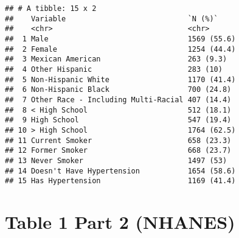 \documentclass[
]{article}
\newenvironment{Shaded}{\begin{snugshade}}{\end{snugshade}}
\newcommand{\AttributeTok}[1]{\textcolor[rgb]{0.13,0.29,0.53}{#1}}
\newcommand{\CommentTok}[1]{\textcolor[rgb]{0.56,0.35,0.01}{\textit{#1}}}
\newcommand{\DecValTok}[1]{\textcolor[rgb]{0.00,0.00,0.81}{#1}}
\newcommand{\DocumentationTok}[1]{\textcolor[rgb]{0.56,0.35,0.01}{\textbf{\textit{#1}}}}
\newcommand{\FunctionTok}[1]{\textcolor[rgb]{0.13,0.29,0.53}{\textbf{#1}}}
\newcommand{\NormalTok}[1]{#1}
\newcommand{\OtherTok}[1]{\textcolor[rgb]{0.56,0.35,0.01}{#1}}
\newcommand{\SpecialCharTok}[1]{\textcolor[rgb]{0.81,0.36,0.00}{\textbf{#1}}}
\newcommand{\StringTok}[1]{\textcolor[rgb]{0.31,0.60,0.02}{#1}}
\begin{document}
\begin{Shaded}
\end{Shaded}

\begin{verbatim}
## # A tibble: 15 x 2
##    Variable                            `N (%)`    
##    <chr>                               <chr>      
##  1 Male                                1569 (55.6)
##  2 Female                              1254 (44.4)
##  3 Mexican American                    263 (9.3)  
##  4 Other Hispanic                      283 (10)   
##  5 Non-Hispanic White                  1170 (41.4)
##  6 Non-Hispanic Black                  700 (24.8) 
##  7 Other Race - Including Multi-Racial 407 (14.4) 
##  8 < High School                       512 (18.1) 
##  9 High School                         547 (19.4) 
## 10 > High School                       1764 (62.5)
## 11 Current Smoker                      658 (23.3) 
## 12 Former Smoker                       668 (23.7) 
## 13 Never Smoker                        1497 (53)  
## 14 Doesn't Have Hypertension           1654 (58.6)
## 15 Has Hypertension                    1169 (41.4)
\end{verbatim}

\section{Table 1 Part 2 (NHANES)}\label{table-1-part-2-nhanes}
\end{document}
